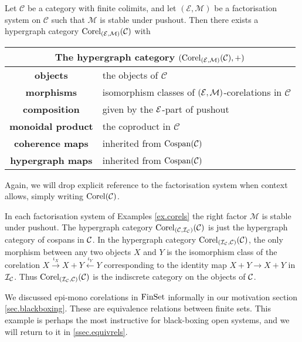 \begin{theorem} \label{thm.cospantocorel}
  Let $\mathcal C$ be a category with finite colimits, and let $(\mathcal E,
  \mathcal M)$ be a factorisation system on $\mathcal C$ such that $\mathcal M$
  is stable under pushout. Then there exists a hypergraph category
  $\mathrm{Corel}_{(\mathcal E,\mathcal M)}(\mathcal C)$ with 
  \smallskip

  \begin{center}
    \begin{tabular}{| c | p{} |}
      \hline
      \multicolumn{2}{|c|}{The hypergraph category $(\mathrm{Corel}_{(\mathcal E,\mathcal M)}(\mathcal C),+)$} \\
      \hline
      \textbf{objects} & the objects of $\mathcal C$ \\ 
      \textbf{morphisms} & isomorphism classes of $(\mathcal E,\mathcal M)$-corelations in $\mathcal C$\\ 
      \textbf{composition} & given by the $\mathcal E$-part of pushout \\
      \textbf{monoidal product} & the coproduct in $\mathcal C$ \\
      \textbf{coherence maps} & inherited from $\operatorname{{Cospan}}(\mathcal C)$  \\
      \textbf{hypergraph maps} & inherited from $\operatorname{{Cospan}}(\mathcal C)$ \\
      \hline
    \end{tabular}
  \end{center}  
  \smallskip
\end{theorem}

Again, we will drop explicit reference to the factorisation system when context allows, simply writing $\mathrm{Corel}(\mathcal C)$.

\begin{examples} \label{ex.corelcats}
In each factorisation system of Examples \ref{ex.corels} the right factor
$\mathcal M$ is stable under pushout. The hypergraph category 
$\operatorname{{Corel}}_{(\mathcal C,\mathcal I_{\mathcal C})}(\mathcal C)$ is just the hypergraph category of
cospans in $\mathcal C$. In the hypergraph category $\operatorname{{Corel}}_{(\mathcal I_{\mathcal C},\mathcal
C)}(\mathcal C)$, the only morphism between any two objects $X$ and $Y$ is the
isomorphism class of the corelation $X \xrightarrow{\iota_X} X+Y
\xleftarrow{\iota_Y} Y$ corresponding to the identity map $X+Y \to X+Y$ in $\mathcal
I_{\mathcal C}$. Thus $\operatorname{{Corel}}_{(\mathcal I_{\mathcal C},\mathcal C)}(\mathcal C)$ is the indiscrete
category on the objects of $\mathcal C$. 

We discussed epi-mono corelations in $\mathrm{FinSet}$ informally in our motivation
section \textsection\ref{sec.blackboxing}. These are equivalence relations
between finite sets. This example is perhaps the most instructive for
black-boxing open systems, and we will return to it in
\textsection\ref{ssec.equivrels}.
\end{examples}

